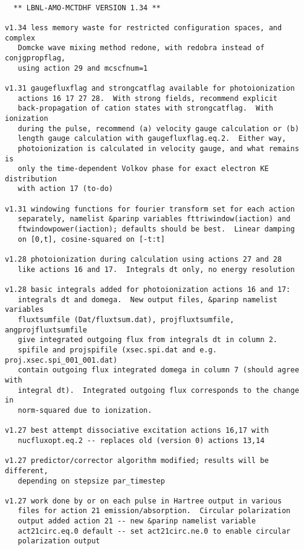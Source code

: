 \begin{verbatim}

  ** LBNL-AMO-MCTDHF VERSION 1.34 **

v1.34 less memory waste for restricted configuration spaces, and complex
   Domcke wave mixing method redone, with redobra instead of conjgpropflag,
   using action 29 and mcscfnum=1

v1.31 gaugefluxflag and strongcatflag available for photoionization
   actions 16 17 27 28.  With strong fields, recommend explicit 
   back-propagation of cation states with strongcatflag.  With ionization 
   during the pulse, recommend (a) velocity gauge calculation or (b) 
   length gauge calculation with gaugefluxflag.eq.2.  Either way, 
   photoionization is calculated in velocity gauge, and what remains is 
   only the time-dependent Volkov phase for exact electron KE distribution 
   with action 17 (to-do)

v1.31 windowing functions for fourier transform set for each action
   separately, namelist &parinp variables fttriwindow(iaction) and 
   ftwindowpower(iaction); defaults should be best.  Linear damping 
   on [0,t], cosine-squared on [-t:t]

v1.28 photoionization during calculation using actions 27 and 28
   like actions 16 and 17.  Integrals dt only, no energy resolution

v1.28 basic integrals added for photoionization actions 16 and 17:
   integrals dt and domega.  New output files, &parinp namelist variables
   fluxtsumfile (Dat/fluxtsum.dat), projfluxtsumfile, angprojfluxtsumfile 
   give integrated outgoing flux from integrals dt in column 2.
   spifile and projspifile (xsec.spi.dat and e.g. proj.xsec.spi_001_001.dat)
   contain outgoing flux integrated domega in column 7 (should agree with 
   integral dt).  Integrated outgoing flux corresponds to the change in 
   norm-squared due to ionization.

v1.27 best attempt dissociative excitation actions 16,17 with
   nucfluxopt.eq.2 -- replaces old (version 0) actions 13,14

v1.27 predictor/corrector algorithm modified; results will be different,
   depending on stepsize par_timestep

v1.27 work done by or on each pulse in Hartree output in various
   files for action 21 emission/absorption.  Circular polarization
   output added action 21 -- new &parinp namelist variable 
   act21circ.eq.0 default -- set act21circ.ne.0 to enable circular 
   polarization output


\end{verbatim}
